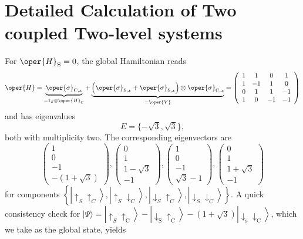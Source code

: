 \chapter{Detailed Calculation of Two coupled Two-level systems\label{app:chap3_appendix}}
For $\oper{H}_{\mathrm{S}}=0$, the global Hamiltonian reads
\begin{equation}
\oper{H}=\underbrace{\oper{\sigma}_{\mathrm{C}, x}}_{=1_S \otimes \oper{H}_{\mathrm{C}}}+\underbrace{\left(\oper{\sigma}_{\mathrm{S}, x}+\oper{\sigma}_{\mathrm{S}, x}\right) \otimes \oper{\sigma}_{\mathrm{C}, x}}_{=\oper{V}}=\left(\begin{array}{cccc}
1 & 1 & 0 & 1 \\
1 & -1 & 1 & 0 \\
0 & 1 & 1 & -1 \\
1 & 0 & -1 & -1
\end{array}\right)
\end{equation}
and has eigenvalues
\begin{equation}
E=\{-\sqrt{3}, \sqrt{3}\},
\end{equation}
both with multiplicity two. The corresponding eigenvectors are
\begin{equation}
\left(\begin{array}{c}
1 \\
0 \\
-1 \\
-(1+\sqrt{3})
\end{array}\right),\left(\begin{array}{c}
0 \\
1 \\
1-\sqrt{3} \\
-1
\end{array}\right),\left(\begin{array}{c}
1 \\
0 \\
-1 \\
\sqrt{3}-1
\end{array}\right),\left(\begin{array}{c}
0 \\
1 \\
1+\sqrt{3} \\
-1
\end{array}\right)
\end{equation}
for components $\left\{\left|\uparrow_S \uparrow_C\right\rangle,\left|\uparrow_S \downarrow_C\right\rangle,\left|\downarrow_S \uparrow_C\right\rangle,\left|\downarrow_S \downarrow_C\right\rangle\right\}$. A quick consistency check for $|\Psi\rangle=\left|\uparrow_S \uparrow_{\mathrm{C}}\right\rangle-\left|\downarrow_{\mathrm{S}} \uparrow_{\mathrm{C}}\right\rangle-(1+\sqrt{3})\left|\downarrow_{\mathrm{s}} \downarrow_{\mathrm{C}}\right\rangle$, which we take as the global state, yields
